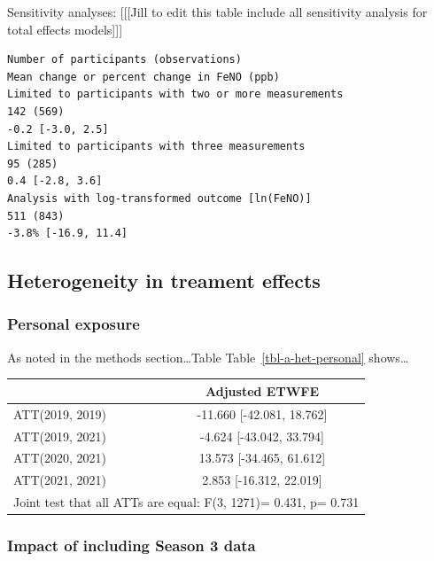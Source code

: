 \documentclass[
  letterpaper,
  DIV=11,
  numbers=noendperiod]{scrartcl}
\makeatletter
\renewenvironment{table}%
  {\renewcommand\familydefault\sfdefault
   \@float{table}}
  {\end@float}
\makeatother
\begin{document}
Sensitivity analyses: {[}{[}{[}Jill to edit this table include all
sensitivity analysis for total effects models{]}{]}{]}

\begin{verbatim}
Number of participants (observations)
Mean change or percent change in FeNO (ppb)
Limited to participants with two or more measurements
142 (569)
-0.2 [-3.0, 2.5]
Limited to participants with three measurements
95 (285)
0.4 [-2.8, 3.6]
Analysis with log-transformed outcome [ln(FeNO)]
511 (843)
-3.8% [-16.9, 11.4]
\end{verbatim}

\hypertarget{heterogeneity-in-treament-effects}{%
\subsection{Heterogeneity in treament
effects}\label{heterogeneity-in-treament-effects}}

\hypertarget{personal-exposure}{%
\subsubsection{Personal exposure}\label{personal-exposure}}

As noted in the methods section\ldots Table
Table~\ref{tbl-a-het-personal} shows\ldots{}

\hypertarget{tbl-a-het-personal}{}
\begin{table}
\caption{\label{tbl-a-het-personal}Heterogenous treatment effects }\tabularnewline

\centering
\begin{tabular}[t]{lc}
\toprule
  & Adjusted ETWFE\\
\midrule
ATT(2019, 2019) & -11.660 [-42.081, 18.762]\\
ATT(2019, 2021) & -4.624 [-43.042, 33.794]\\
ATT(2020, 2021) & 13.573 [-34.465, 61.612]\\
ATT(2021, 2021) & 2.853 [-16.312, 22.019]\\
\bottomrule
\multicolumn{2}{l}{\rule{0pt}{1em}Joint test that all ATTs are equal: F(3, 1271)= 0.431, p= 0.731}\\
\end{tabular}
\end{table}

\hypertarget{impact-of-including-season-3-data}{%
\subsubsection{Impact of including Season 3
data}\label{impact-of-including-season-3-data}}
\end{document}
